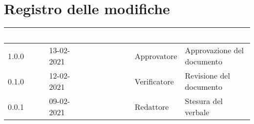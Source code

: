 \section*{Registro delle modifiche}
{
\setcounter{table}{-1}
{
\renewcommand{\arraystretch}{1.5}
\centering
\begin{longtable}{C{1.7cm} C{2.5cm} C{3.2cm} C{2.7cm} C{4.8cm}}
\textcolor{white}{\textbf{Versione}}&
\textcolor{white}{\textbf{Data}}&
\textcolor{white}{\textbf{Nominativo}}&
\textcolor{white}{\textbf{Ruolo}}&
\textcolor{white}{\textbf{Descrizione}}\\	
\endhead

1.0.0 & 13-02-2021 & \BM{} & Approvatore & Approvazione del documento\\	
0.1.0 & 12-02-2021 & \ZM{} & Verificatore & Revisione del documento\\		
0.0.1 & 09-02-2021 & \SH{} & Redattore & Stesura del verbale\\
		
\end{longtable}
}
}
